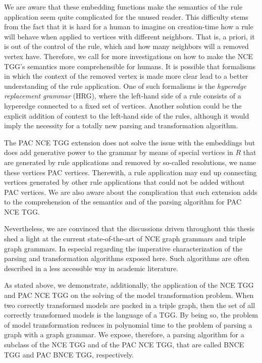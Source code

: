 We are aware that these embedding functions make the semantics of the rule application seem quite complicated for the unused reader. This difficulty stems from the fact that it is hard for a human to imagine on creation-time how a rule will behave when applied to vertices with different neighbors. That is, a priori, it is out of the control of the rule, which and how many neighbors will a removed vertex have. Therefore, we call for more investigations on how to make the NCE TGG's semantics more comprehensible for humans. It is possible that formalisms in which the context of the removed vertex is made more clear lead to a better understanding of the rule application. One of such formalisms is the \emph{hyperedge replacement grammar} (HRG), where the left-hand side of a rule consists of a hyperedge connected to a fixed set of vertices. Another solution could be the explicit addition of context to the left-hand side of the rules, although it would imply the necessity for a totally new parsing and transformation algorithm.

The PAC NCE TGG extension does not solve the issue with the embeddings but does add generative power to the grammar by means of special vertices in $R$ that are generated by rule applications and removed by so-called resolutions, we name these vertices PAC vertices. Therewith, a rule application may end up connecting vertices generated by other rule applications that could not be added without PAC vertices. We are also aware about the complication that such extension adds to the comprehension of the semantics and of the parsing algorithm for PAC NCE TGG.

Nevertheless, we are convinced that the discussions driven throughout this thesis shed a light at the current state-of-the-art of NCE graph grammars and triple graph grammars. In especial regarding the imperative characterization of the parsing and transformation algorithms exposed here. Such algorithms are often described in a less accessible way in academic literature.

As stated above, we demonstrate, additionally, the application of the NCE TGG and PAC NCE TGG on the solving of the model transformation problem. When two correctly transformed models are packed in a triple graph, then the set of all correctly transformed models is the language of a TGG. By being so, the problem of model transformation reduces in polynomial time to the problem of parsing a graph with a graph grammar. We expose, therefore, a parsing algorithm for a subclass of the NCE TGG and of the PAC NCE TGG, that are called BNCE TGG and PAC BNCE TGG, respectively.

